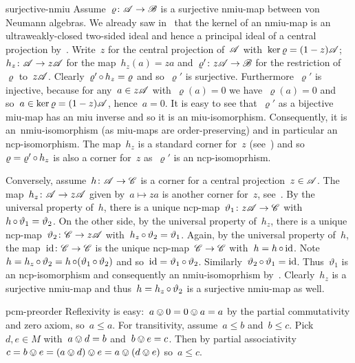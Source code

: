 \begin{solution}{surjective-nmiu}%
Assume~$\varrho \colon \mathscr{A} \to \mathscr{B}$
    is a surjective nmiu-map between von Neumann algebras.
We already saw in~
    that the kernel of an nmiu-map is an ultraweakly-closed
    two-sided ideal and hence a principal ideal of a central projection
        by~.
    Write~$z$ for the central projection of~$\mathscr{A}$
        with~$\ker \varrho = (1-z) \mathscr{A}$;
        $h_z \colon \mathscr{A} \to z\mathscr{A}$ for the map~$h_z(a) = za$
        and~$\varrho'\colon z\mathscr{A} \to \mathscr{B}$
        for the restriction of~$\varrho$ to~$z \mathscr{A}$.
    Clearly~$\varrho' \mathop{\circ} h_z = \varrho$ and so~$\varrho'$ is surjective.
    Furthermore~$\varrho'$ is injective,
        because for any~$a \in z\mathscr{A}$ with~$\varrho(a)=0$
        we have~$\varrho(a)=0$ and so~$a \in \ker \varrho = (1-z)\mathscr{A}$,
        hence~$a = 0$.
It is easy to see that~$\varrho'$ as a bijective miu-map
    has an miu inverse and so it is an miu-isomorphism.
    Consequently, it is an~nmiu-isomorphism (as
        miu-maps are order-preserving)
        and in particular an ncp-isomorphism.
The map~$h_z$ is a standard corner for~$z$ (see~)
    and so~$\varrho = \varrho' \mathop{\circ} h_z$ is also a corner for~$z$
    as~$\varrho'$ is an ncp-isomoprhism.

Conversely, assume~$h\colon \mathscr{A} \to \mathscr{C}$
        is a corner for a central projection~$z \in \mathscr{A}$.
The map~$h_z\colon \mathscr{A} \to z \mathscr{A}$ given by~$a \mapsto za$
    is another corner for~$z$, see~.
By the universal property of~$h$,
    there is a unique ncp-map~$\vartheta_1\colon z\mathscr{A} \to \mathscr{C}$
            with~$h \mathop{\circ} \vartheta_1 =\vartheta_2$.
On the other side, by the universal property of~$h_z$,
    there is a unique ncp-map~$\vartheta_2\colon \mathscr{C}\to z\mathscr{A}$
    with~$h_z \mathop{\circ} \vartheta_2 = \vartheta_1$.
Again, by the universal property of~$h$,
    the map~$\mathrm{id}\colon \mathscr{C} \to \mathscr{C}$
    is the unique ncp-map~$\mathscr{C} \to \mathscr{C}$
        with~$h = h \mathop{\circ} \mathrm{id}$.
    Note~$h = h_z \mathop{\circ} \vartheta_2 = h \mathop{\circ} (\vartheta_1 \mathop{\circ} \vartheta_2)$ and so~$\mathrm{id} = \vartheta_1 \mathop{\circ} \vartheta_2$.
    Similarly~$\vartheta_2 \mathop{\circ} \vartheta_1 = \mathrm{id}$.
    Thus~$\vartheta_1$ is an ncp-isomorphism
        and consequently an nmiu-isomoprhism by~.
Clearly~$h_z$ is a surjective nmiu-map
    and thus~$h = h_z \mathop{\circ} \vartheta_2$
    is a surjective nmiu-map as well.
\end{solution}
\begin{solution}{pcm-preorder}%
Reflexivity is easy:~$a \ovee 0 = 0 \ovee a = a$
    by the partial commutativity and zero axiom, so~$a \leq a$.
For transitivity, assume~$a \leq b$ and~$b \leq c$.
Pick~$d,e \in M$
    with~$a \ovee d = b$ and~$b \ovee e = c$.
Then by partial
associativity~$c = b \ovee e = (a \ovee d) \ovee e = a \ovee (d \ovee e)$
so~$a \leq c$.
\end{solution}
